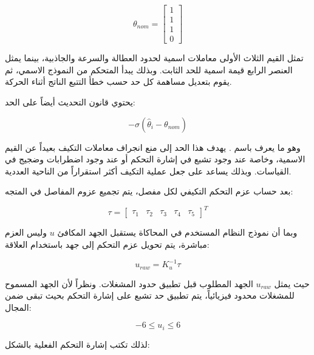 \begin{equation}
\theta_{nom}
=
\begin{bmatrix}
1\\
1\\
1\\
0
\end{bmatrix}
\label{eq:actc_nominal_theta}
\end{equation}

تمثل القيم الثلاث الأولى معاملات اسمية لحدود العطالة والسرعة والجاذبية، بينما يمثل العنصر الرابع قيمة اسمية للحد الثابت. وبذلك يبدأ المتحكم من النموذج الاسمي، ثم يقوم بتعديل مساهمة كل حد حسب خطأ التتبع الناتج أثناء الحركة.

يحتوي قانون التحديث أيضاً على الحد:

\begin{equation}
-
\sigma
\left(
\hat{\theta}_i-\theta_{nom}
\right)
\label{eq:actc_sigma_modification}
\end{equation}

وهو ما يعرف باسم . يهدف هذا الحد إلى منع انجراف معاملات التكيف بعيداً عن القيم الاسمية، وخاصة عند وجود تشبع في إشارة التحكم أو عند وجود اضطرابات وضجيج في القياسات. وبذلك يساعد على جعل عملية التكيف أكثر استقراراً من الناحية العددية.

بعد حساب عزم التحكم التكيفي لكل مفصل، يتم تجميع عزوم المفاصل في المتجه:

\begin{equation}
\tau
=
\begin{bmatrix}
\tau_1&
\tau_2&
\tau_3&
\tau_4&
\tau_5
\end{bmatrix}^{T}
\label{eq:actc_control_torque_vector}
\end{equation}

وبما أن نموذج النظام المستخدم في المحاكاة يستقبل الجهد المكافئ \(u\) وليس العزم مباشرة، يتم تحويل عزم التحكم إلى جهد باستخدام العلاقة:

\begin{equation}
u_{raw}
=
K_u^{-1}\tau
\label{eq:actc_raw_voltage}
\end{equation}

حيث يمثل \(u_{raw}\) الجهد المطلوب قبل تطبيق حدود المشغلات. ونظراً لأن الجهد المسموح للمشغلات محدود فيزيائياً، يتم تطبيق حد تشبع على إشارة التحكم بحيث تبقى ضمن المجال:

\begin{equation}
-6 \leq u_i \leq 6
\label{eq:actc_voltage_limits}
\end{equation}

لذلك تكتب إشارة التحكم الفعلية بالشكل:

